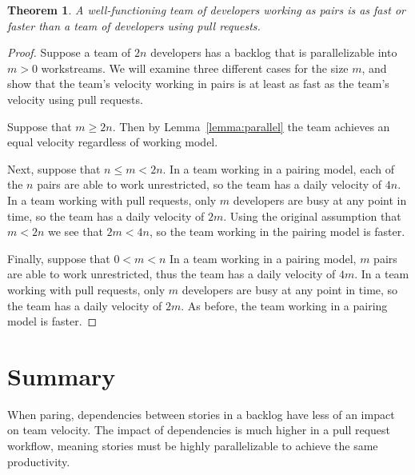 \documentclass[letterpaper]{article}
\newtheorem{theorem}{Theorem}[section]
\theoremstyle{definition}
\begin{document}
    \begin{theorem}
        A well-functioning team of developers working as pairs is as fast or faster than a team of developers using pull
        requests.
    \end{theorem}
    \begin{proof}
        Suppose a team of $2n$ developers has a backlog that is parallelizable into $m > 0$ workstreams.
        We will examine three different cases for the size $m$, and show that the team's velocity working in pairs is at
        least as fast as the team's velocity using pull requests.

        Suppose that $m\geq 2n$.
        Then by Lemma~\ref{lemma:parallel} the team achieves an equal velocity regardless of working model.

        Next, suppose that $n\leq m < 2n$.
        In a team working in a pairing model, each of the $n$ pairs are able to work unrestricted, so the team has a
        daily velocity of $4n$.
        In a team working with pull requests, only $m$ developers are busy at any point in time, so the team has a daily
        velocity of $2m$.
        Using the original assumption that $m < 2n$ we see that $2m < 4n$, so the team working in the pairing model is
        faster.

        Finally, suppose that $0 < m < n$
        In a team working in a pairing model, $m$ pairs are able to work unrestricted, thus the team has a daily
        velocity of $4m$.
        In a team working with pull requests, only $m$ developers are busy at any point in time, so the team has a daily
        velocity of $2m$.
        As before, the team working in a pairing model is faster.
    \end{proof}


    \section{Summary}\label{sec:summary}

    When paring, dependencies between stories in a backlog have less of an impact on team velocity.
    The impact of dependencies is much higher in a pull request workflow, meaning stories must be highly parallelizable
    to achieve the same productivity.

    
    
\end{document}
